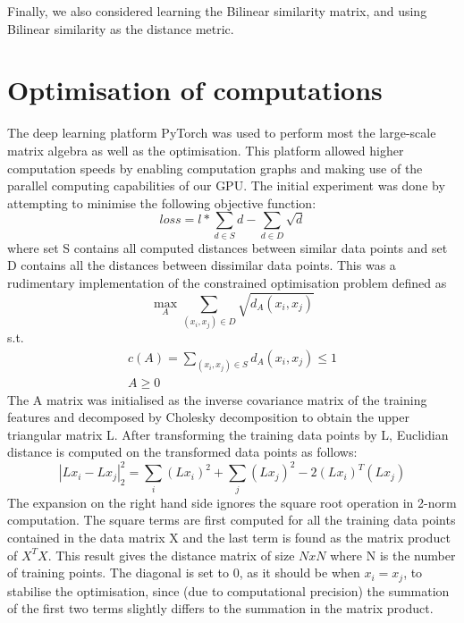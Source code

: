 \documentclass[10pt,technote]{IEEEtran}
\begin{document}
Finally, we also considered learning the Bilinear similarity matrix, and using Bilinear similarity as the distance metric. 

\appendices

\section{Optimisation of computations}

The deep learning platform PyTorch was used to perform most the large-scale matrix algebra as well as the optimisation. This platform allowed higher computation speeds by enabling computation graphs and making use of the parallel computing capabilities of our GPU.
The initial experiment was done by attempting to minimise the following objective function: \begin{equation}
    loss = l*\sum_{d \in S}d -  \sum_{d \in D}\sqrt{d}
\end{equation}
where set S contains all computed distances between similar data points and set D contains all the distances between dissimilar data points. This was a rudimentary implementation of the constrained optimisation problem defined as
\begin{equation}
    \max_{A}\sum_{(x_i, x_j) \in D}\sqrt{d_A (x_i, x_j)}
\end{equation}
s.t.
\begin{equation}
    \begin{aligned}
        c(A) = \sum_{(x_i, x_j) \in S}d_A (x_i, x_j) \le 1 \\
        A \ge 0
    \end{aligned}
\end{equation}
The A matrix was initialised as the 
inverse covariance matrix of the training features and decomposed by Cholesky decomposition to obtain the upper triangular matrix L. After transforming the training data points by L, Euclidian distance is computed on the transformed data points as follows:
\begin{equation}
    |Lx_i - Lx_j|_2^2 = \sum_{i}(Lx_i)^2 + \sum_{j}(Lx_j)^2 - 2(Lx_i)^T(Lx_j)
\end{equation}
The expansion on the right hand side ignores the square root operation in 2-norm computation. The square terms are first computed for all the training data points contained in the data matrix X and the last term is found as the matrix product of $X^TX$. This result gives the distance matrix of size $NxN$ where N is the number of training points. The diagonal is set to 0, as it should be when $x_i = x_j$, to stabilise the optimisation, since (due to computational precision) the summation of the first two terms slightly differs to the summation in the matrix product. 
\end{document}
